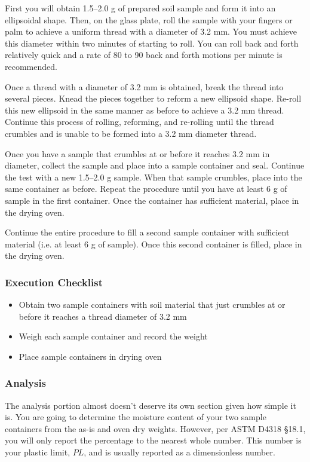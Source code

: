 \documentclass[12pt]{article}
\begin{document}
First you will obtain 1.5--2.0 g of prepared soil sample and form it into an ellipsoidal shape. Then, on the glass plate, roll the sample with your fingers or palm to achieve a uniform thread with a diameter of 3.2 mm. You must achieve this diameter within two minutes of starting to roll. You can roll back and forth relatively quick and a rate of 80 to 90 back and forth motions per minute is recommended.

Once a thread with a diameter of 3.2 mm is obtained, break the thread into several pieces. Knead the pieces together to reform a new ellipsoid shape. Re-roll this new ellipsoid in the same manner as before to achieve a 3.2 mm thread. Continue this process of rolling, reforming, and re-rolling until the thread crumbles and is unable to be formed into a 3.2 mm diameter thread.

Once you have a sample that crumbles at or before it reaches 3.2 mm in diameter, collect the sample and place into a sample container and seal. Continue the test with a new 1.5--2.0 g sample. When that sample crumbles, place into the same container as before. Repeat the procedure until you have at least 6 g of sample in the first container. Once the container has sufficient material, place in the drying oven.

Continue the entire procedure to fill a second sample container with sufficient material (i.e. at least 6 g of sample). Once this second container is filled, place in the drying oven.

\subsubsection*{Execution Checklist}
\begin{itemize}
    \item Obtain two sample containers with soil material that just crumbles at or before it reaches a thread diameter of 3.2 mm
    \item Weigh each sample container and record the weight
    \item Place sample containers in drying oven
\end{itemize}

\subsubsection{Analysis}
The analysis portion almost doesn't deserve its own section given how simple it is. You are going to determine the moisture content of your two sample containers from the as-is and oven dry weights. However, per ASTM D4318 \S18.1, you will only report the percentage to the nearest whole number. This number is your plastic limit, $PL$, and is usually reported as a dimensionless number.
\end{document}
